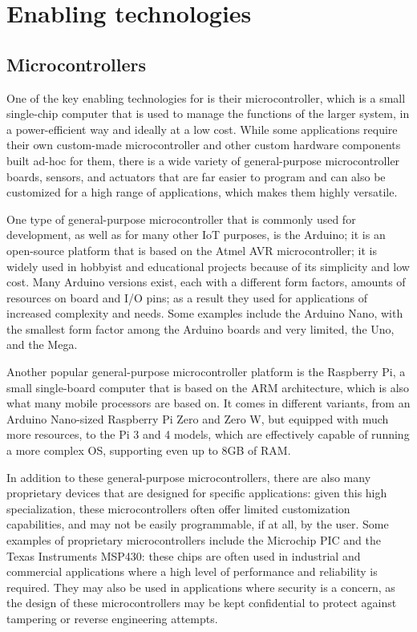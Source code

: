 \section{Enabling technologies}
\subsection{Microcontrollers}
One of the key enabling technologies for \ess is their microcontroller, which is a small single-chip computer that is used to manage the functions of the larger system, in a power-efficient way and ideally at a low cost. While some applications require their own custom-made microcontroller and other custom hardware components built ad-hoc for them, there is a wide variety of general-purpose microcontroller boards, sensors, and actuators that are far easier to program and can also be customized for a high range of applications, which makes them highly versatile.

One type of general-purpose microcontroller that is commonly used for \ess development, as well as for many other IoT purposes, is the Arduino; it is an open-source platform that is based on the Atmel AVR microcontroller; it is widely used in hobbyist and educational projects because of its simplicity and low cost. Many Arduino versions exist, each with a different form factors, amounts of resources on board and I/O pins; as a result they used for applications of increased complexity and needs. Some examples include the Arduino Nano, with the smallest form factor among the Arduino boards and very limited, the Uno, and the Mega.


Another popular general-purpose microcontroller platform is the Raspberry Pi, a small single-board computer that is based on the ARM architecture, which is also what many mobile processors are based on. It comes in different variants, from an Arduino Nano-sized Raspberry Pi Zero and Zero W, but equipped with much more resources, to the Pi 3 and 4 models, which are effectively capable of running a more complex OS, supporting even up to 8GB of RAM.

In addition to these general-purpose microcontrollers, there are also many proprietary devices that are designed for specific applications: given this high specialization, these microcontrollers often offer limited customization capabilities, and may not be easily programmable, if at all, by the user. Some examples of proprietary microcontrollers include the Microchip PIC and the Texas Instruments MSP430: these chips are often used in industrial and commercial applications where a high level of performance and reliability is required. They may also be used in applications where security is a concern, as the design of these microcontrollers may be kept confidential to protect against tampering or reverse engineering attempts.


